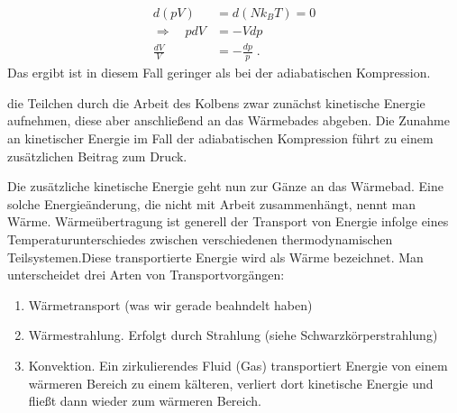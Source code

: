 \begin{align*}
 d(p V)&=  d (N k_{B} T) = 0\\
\Rightarrow\quad  p dV &= -V dp\\
\frac{dV}{V} &= - \frac{dp}{p}\;.
\end{align*}
Das ergibt
ist in diesem Fall geringer als bei der adiabatischen Kompression.

die Teilchen durch die Arbeit des Kolbens zwar zunächst kinetische Energie aufnehmen, diese aber
anschließend an das Wärmebades abgeben. Die  Zunahme  an kinetischer Energie 
im Fall der adiabatischen Kompression führt zu einem zusätzlichen Beitrag zum Druck. 

Die zusätzliche kinetische Energie geht nun zur Gänze  an  das Wärmebad. Eine solche Energieänderung,
die nicht mit Arbeit zusammenhängt, nennt man {\color{blue}Wärme}.
Wärmeübertragung ist generell der Transport von Energie infolge eines Temperaturunterschiedes zwischen verschiedenen thermodynamischen
Teilsystemen.Diese transportierte Energie wird als Wärme bezeichnet. Man unterscheidet drei Arten von Transportvorgängen:
\begin{enumerate}
	\item Wärmetransport (was wir gerade beahndelt haben)
	\item Wärmestrahlung. Erfolgt durch Strahlung (siehe Schwarzkörperstrahlung)
	\item Konvektion. Ein zirkulierendes Fluid (Gas) transportiert Energie von einem wärmeren Bereich zu einem kälteren, verliert dort kinetische Energie und fließt dann wieder zum wärmeren Bereich. 
\end{enumerate}

